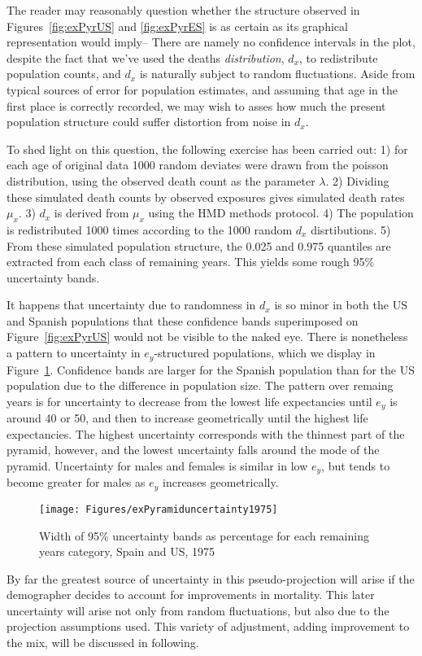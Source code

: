 \FloatBarrier
\label{sec:structuncertainty}
The reader may reasonably question whether the structure observed in
Figures~\ref{fig:exPyrUS} and \ref{fig:exPyrES} is as certain as its graphical
representation would imply-- There are namely no confidence intervals in the
plot, despite the fact that we've used the deaths \textit{distribution}, $d_x$,
to redistribute population counts, and $d_x$ is naturally subject to random
fluctuations. Aside from typical sources of error for population estimates, and
assuming that age in the first place is correctly recorded, we may wish to asses
how much the present population structure could suffer distortion from noise in
$d_x$. 

To shed light on this question, the following exercise has been
carried out: 1) for each age of original data 1000 random deviates were drawn
from the poisson distribution, using the observed death count as the parameter
$\lambda$. 2) Dividing these simulated death counts by observed exposures gives
simulated death rates $\mu_x$. 3) $d_x$ is derived from $\mu_x$ using the HMD
methods protocol. 4) The population is redistributed 1000 times according to the
1000 random $d_x$ disrtibutions. 5) From these simulated population structure,
the 0.025 and 0.975 quantiles are extracted from each class of remaining years.
This yields some rough 95\% uncertainty bands.

It happens that uncertainty due to randomness in $d_x$ is so minor in both the
US and Spanish populations that these confidence bands superimposed on
Figure~\ref{fig:exPyrUS} would not be visible to the naked eye. There is
nonetheless a pattern to uncertainty in $e_y$-structured populations, 
which we display in Figure~\ref{fig:PyramidUncertainty}. Confidence bands are
larger for the Spanish population than for the US population due to
the difference in population size. The pattern over remaing years is for
uncertainty to decrease from the lowest life expectancies until $e_y$ is around 40 or 50, and then to
increase geometrically until the highest life expectancies. The highest
uncertainty corresponds with the thinnest part of the pyramid, however, and the
lowest uncertainty falls around the mode of the pyramid. Uncertainty for males
and females is similar in low $e_y$, but tends to become greater for males as
$e_y$ increases geometrically.

\begin{figure}
      \centering
      \caption{Width of 95\% uncertainty bands as percentage for each
      remaining years category, Spain and US, 1975}
         \texttt{[image: Figures/exPyramiduncertainty1975]}
      \label{fig:PyramidUncertainty} 
\end{figure}

By far the greatest source of uncertainty in this
pseudo-projection will arise if the demographer decides to account for
improvements in mortality. This later uncertainty will arise not only from
random fluctuations, but also due to the projection assumptions used. This
variety of adjustment, adding improvement to the mix, will be discussed in
following.

\FloatBarrier